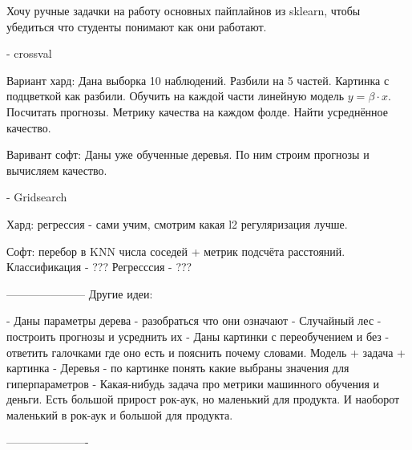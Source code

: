 
Хочу ручные задачки на работу основных пайплайнов из sklearn, чтобы убедиться что студенты понимают как они работают. 



- crossval 

Вариант хард:  Дана выборка 10 наблюдений. Разбили на 5 частей. Картинка с подцветкой как разбили. Обучить на каждой части линейную модель $y = \beta \cdot x.$ Посчитать прогнозы. Метрику качества на каждом фолде. Найти усреднённое качество. 

Варивант софт:  Даны уже обученные деревья. По ним строим прогнозы и вычисляем качество.  


- Gridsearch

Хард:  регрессия - сами учим, смотрим какая l2 регуляризация лучше. 

Софт:  перебор в KNN числа соседей + метрик подсчёта расстояний. Классификация - ??? Регресссия - ??? 

---------------------
Другие идеи:

- Даны параметры дерева - разобраться что они означают
- Случайный лес - построить прогнозы и усреднить их
- Даны картинки с переобучением и без - ответить галочками где оно есть и пояснить почему словами. Модель + задача + картинка
- Деревья - по картинке понять какие выбраны значения для гиперпараметров - Какая-нибудь задача про метрики машинного обучения и деньги. Есть большой прирост рок-аук, но маленький для продукта. И наоборот маленький в рок-аук и большой для продукта. 

----------------------



